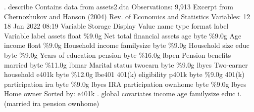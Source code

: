. describe
{\smallskip}
Contains data from assets2.dta
 Observations:         9,913                  Excerpt from Chernozhukov and
                                                Hanson (2004) Rev. of Economics
                                                and Statistics
    Variables:            12                  18 Jan 2022 08:19
Variable      Storage   Display    Value
    name         type    format    label      Variable label
assets          float   \%9.0g                 Net total financial assets
age             byte    \%9.0g                 Age
income          float   \%9.0g                 Household income
familysize      byte    \%9.0g                 Household size
educ            byte    \%9.0g                 Years of education
pension         byte    \%16.0g     lbpen      Pension benefits
married         byte    \%11.0g     lbmar      Marital status
twoearn         byte    \%9.0g      lbyes      Two-earner household
e401k           byte    \%12.0g     lbe401     401(k) eligibility
p401k           byte    \%9.0g                 401(k) participation
ira             byte    \%9.0g      lbyes      IRA participation
ownhome         byte    \%9.0g      lbyes      Home owner
Sorted by: e401k
{\smallskip}
. global covariates income age familysize educ i.(married ira pension ownhome)
{\smallskip}
